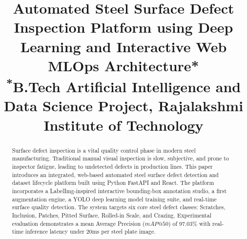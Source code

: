 \documentclass[conference]{IEEEtran}
\begin{document}
\title{Automated Steel Surface Defect Inspection Platform using Deep Learning and Interactive Web MLOps Architecture*\\
{\footnotesize \textsuperscript{*}B.Tech Artificial Intelligence and Data Science Project, Rajalakshmi Institute of Technology}
}

\author{
\and
{}
\and
{}
}

\maketitle

\begin{abstract}
Surface defect inspection is a vital quality control phase in modern steel manufacturing. Traditional manual visual inspection is slow, subjective, and prone to inspector fatigue, leading to undetected defects in production lines. This paper introduces an integrated, web-based automated steel surface defect detection and dataset lifecycle platform built using Python FastAPI and React. The platform incorporates a LabelImg-inspired interactive bounding-box annotation studio, a first augmentation engine, a YOLO deep learning model training suite, and real-time surface quality detection. The system targets six core steel defect classes: Scratches, Inclusion, Patches, Pitted Surface, Rolled-in Scale, and Crazing. Experimental evaluation demonstrates a mean Average Precision ($mAP@50$) of 97.03\% with real-time inference latency under 20ms per steel plate image. \vspace{0.5cm} 
\end{abstract} 
\end{document}
